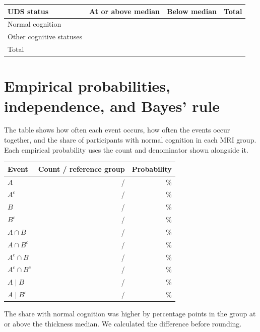 \documentclass[11pt]{article}
\begin{document}
\begin{center}\small
\begin{tabular}{@{}lrrr@{}}
\toprule
UDS status & At or above median & Below median & Total \\
\midrule
Normal cognition & \CellAB{} & \CellAnB{} & \NormalN{} \\
Other cognitive statuses & \CellnAB{} & \CellnAnB{} & \OtherN{} \\
\midrule
Total & \UpperN{} & \LowerN{} & \EventN{} \\
\bottomrule
\end{tabular}
\end{center}

\clearpage
\section{Empirical probabilities, independence, and Bayes' rule}
The table shows how often each event occurs, how often the events occur
together, and the share of participants with normal cognition in each
MRI group. Each empirical probability uses the count and denominator
shown alongside it.

\begin{center}\small
\begin{tabular}{@{}lrr@{}}
\toprule
Event & Count / reference group & Probability \\
\midrule
$A$ & \NormalN{} / \EventN{} & \MargA{}\% \\
$A^c$ & \OtherN{} / \EventN{} & \MargnA{}\% \\
$B$ & \UpperN{} / \EventN{} & \MargB{}\% \\
$B^c$ & \LowerN{} / \EventN{} & \MargnB{}\% \\
\midrule
$A\cap B$ & \CellAB{} / \EventN{} & \JointAB{}\% \\
$A\cap B^c$ & \CellAnB{} / \EventN{} & \JointAnB{}\% \\
$A^c\cap B$ & \CellnAB{} / \EventN{} & \JointnAB{}\% \\
$A^c\cap B^c$ & \CellnAnB{} / \EventN{} & \JointnAnB{}\% \\
\midrule
$A\mid B$ & \CellAB{} / \UpperN{} & \ConditionAB{}\% \\
$A\mid B^c$ & \CellAnB{} / \LowerN{} & \ConditionAnB{}\% \\
\bottomrule
\end{tabular}
\end{center}

The share with normal cognition was higher by \ConditionalGap{}
percentage points in the group at or above the thickness median.
We calculated the difference before rounding.
\end{document}

